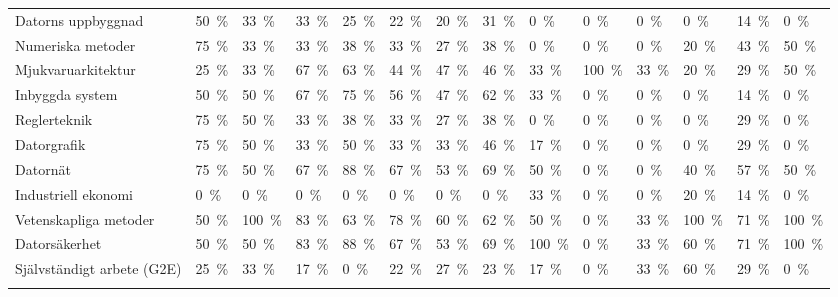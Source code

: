 \begin{sidewaystable}[H]
{\begin{tabular}{p{10cm}lllllllllllll}
Datorns uppbyggnad&50~\%&33~\%&33~\%&25~\%&22~\%&20~\%&31~\%&0~\%&0~\%&0~\%&0~\%&14~\%&0~\% \tabularnewline
Numeriska metoder&75~\%&33~\%&33~\%&38~\%&33~\%&27~\%&38~\%&0~\%&0~\%&0~\%&20~\%&43~\%&50~\% \tabularnewline
Mjukvaruarkitektur&25~\%&33~\%&67~\%&63~\%&44~\%&47~\%&46~\%&33~\%&100~\%&33~\%&20~\%&29~\%&50~\% \tabularnewline
Inbyggda system&50~\%&50~\%&67~\%&75~\%&56~\%&47~\%&62~\%&33~\%&0~\%&0~\%&0~\%&14~\%&0~\% \tabularnewline
Reglerteknik&75~\%&50~\%&33~\%&38~\%&33~\%&27~\%&38~\%&0~\%&0~\%&0~\%&0~\%&29~\%&0~\% \tabularnewline
Datorgrafik&75~\%&50~\%&33~\%&50~\%&33~\%&33~\%&46~\%&17~\%&0~\%&0~\%&0~\%&29~\%&0~\% \tabularnewline
Datornät&75~\%&50~\%&67~\%&88~\%&67~\%&53~\%&69~\%&50~\%&0~\%&0~\%&40~\%&57~\%&50~\% \tabularnewline
Industriell ekonomi&0~\%&0~\%&0~\%&0~\%&0~\%&0~\%&0~\%&33~\%&0~\%&0~\%&20~\%&14~\%&0~\% \tabularnewline
Vetenskapliga metoder&50~\%&100~\%&83~\%&63~\%&78~\%&60~\%&62~\%&50~\%&0~\%&33~\%&100~\%&71~\%&100~\% \tabularnewline
Datorsäkerhet&50~\%&50~\%&83~\%&88~\%&67~\%&53~\%&69~\%&100~\%&0~\%&33~\%&60~\%&71~\%&100~\% \tabularnewline
Självständigt arbete (G2E)&25~\%&33~\%&17~\%&0~\%&22~\%&27~\%&23~\%&17~\%&0~\%&33~\%&60~\%&29~\%&0~\% \tabularnewline
\tabularnewline
\bottomrule
\end{tabular}
}
\end{sidewaystable}


